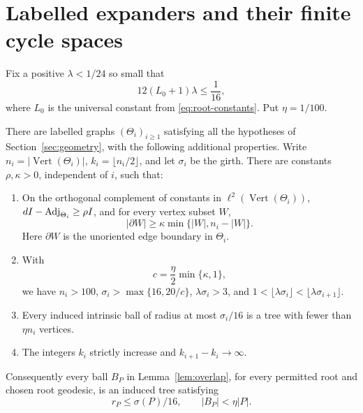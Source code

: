 \section{Labelled expanders and their finite cycle spaces}\label{sec:data}

Fix a positive \(\lambda<1/24\) so small that
\begin{equation}\label{eq:lambda-choice}
12(L_0+1)\lambda\le\frac1{16},
\end{equation}
where \(L_0\) is the universal constant from
\eqref{eq:root-constants}. Put \(\eta=1/100\).

\begin{proposition}\label{prop:data}
There are labelled graphs \((\Theta_i)_{i\ge1}\) satisfying all the
hypotheses of Section~\ref{sec:geometry}, with the following additional
properties. Write \(n_i=|\operatorname{Vert}(\Theta_i)|\),
\(k_i=\lfloor n_i/2\rfloor\), and let \(\sigma_i\) be the girth.
There are constants \(\rho,\kappa>0\), independent of \(i\), such that:
\begin{enumerate}[label=\textup{(\roman*)}]
\item On the orthogonal complement of constants in
\(\ell^2(\operatorname{Vert}(\Theta_i))\),
\(dI-\operatorname{Adj}_{\Theta_i}\ge\rho I\), and for every vertex subset \(W\),
\begin{equation}\label{eq:expansion}
|\partial W|\ge\kappa\min\{|W|,n_i-|W|\}.
\end{equation}
Here \(\partial W\) is the unoriented edge boundary in \(\Theta_i\).
\item With
\begin{equation}\label{eq:c-definition}
c=\frac\eta2\min\{\kappa,1\},
\end{equation}
we have \(n_i>100\), \(\sigma_i>\max\{16,20/c\}\),
\(\lambda\sigma_i>3\), and
\(1<\lfloor\lambda\sigma_i\rfloor<\lfloor\lambda\sigma_{i+1}\rfloor\).
\item Every induced intrinsic ball of radius at most \(\sigma_i/16\)
is a tree with fewer than \(\eta n_i\) vertices.
\item The integers \(k_i\) strictly increase and
\(k_{i+1}-k_i\to\infty\).
\end{enumerate}
Consequently every ball \(B_P\) in Lemma~\ref{lem:overlap}, for every
permitted root and chosen root geodesic, is an induced tree satisfying
\begin{equation}\label{eq:small-ball}
r_P\le\sigma(P)/16,\qquad |B_P|<\eta|P|.
\end{equation}
\end{proposition}


